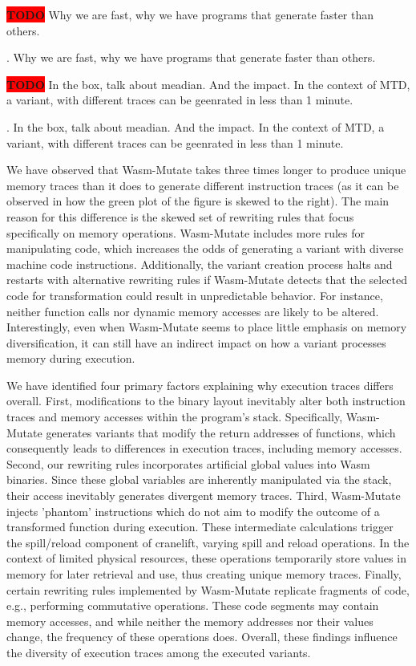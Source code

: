\documentclass[sigplan,screen]{acmart}
\newcommand*\badge[1]{ \colorbox{red}{\color{white}#1}}
\newcommand{\tool}{{\sc Wasm-Mutate}\xspace}
\newcommand{\wasm}{Wasm\xspace}
\newcommand{\todo}[1]{%
\refstepcounter{todo}
\noindent\textbf{\badge{TODO}} {\color{red}#1}
\addcontentsline{td}{todo}
{\color{red}\thesection.\thetodo\xspace #1}}
\begin{document}
\todo{Why we are fast, why we have  programs that generate faster than others.}

\todo{In the box, talk about meadian. And the impact. In the context of MTD, a variant, with different traces can be geenrated in less than 1 minute.}

We have observed that \tool takes three times longer to produce unique memory traces than it does to generate different instruction traces (as it can be observed in how the green plot of the figure is skewed to the right). 
The main reason for this difference is the skewed set of rewriting rules that focus specifically on memory operations. 
\tool includes more rules for manipulating code, which increases the odds of generating a variant with diverse machine code instructions.
Additionally, the variant creation process halts and restarts with alternative rewriting rules if \tool detects that the selected code for transformation could result in unpredictable behavior. 
For instance, neither function calls nor dynamic memory accesses are likely to be altered.
Interestingly, even when \tool seems to place little emphasis on memory diversification, it can still have an indirect impact on how a variant processes memory during execution.

We have identified four primary factors explaining why execution traces differs overall.
First, modifications to the binary layout inevitably alter both instruction traces and memory accesses within the program's stack. 
Specifically, \tool generates variants that modify the return addresses of functions, which consequently leads to differences in execution traces, including memory accesses.
Second, our rewriting rules incorporates artificial global values into \wasm binaries. 
Since these global variables are inherently manipulated via the stack, their access inevitably generates divergent memory traces.
Third, \tool injects 'phantom' instructions which do not aim to modify the outcome of a transformed function during execution. 
These intermediate calculations trigger the spill/reload component of cranelift, varying spill and reload operations. 
In the context of limited physical resources, these operations temporarily store values in memory for later retrieval and use, thus creating unique memory traces.
Finally, certain rewriting rules implemented by \tool replicate fragments of code, e.g., performing commutative operations. 
These code segments may contain memory accesses, and while neither the memory addresses nor their values change, the frequency of these operations does.
Overall, these findings influence the diversity of execution traces among the executed variants. 
\end{document}
